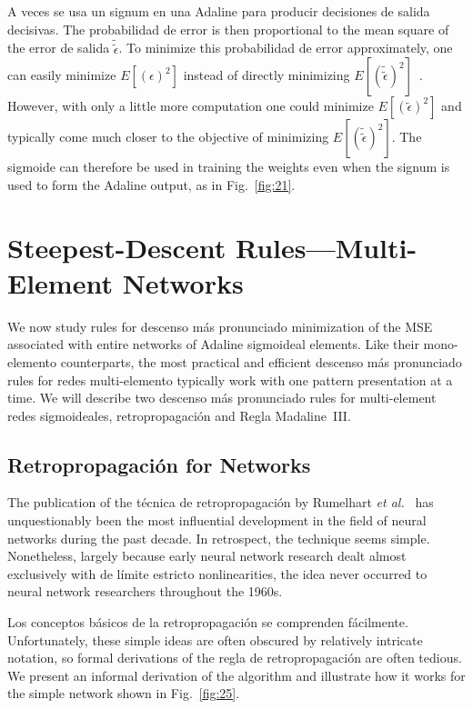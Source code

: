 \documentclass[10pt,twocolumn]{article}
\begin{document}
A veces se usa un signum en una Adaline para producir decisiones de salida decisivas. The
probabilidad de error is then proportional to the mean square of the error de salida
$\tilde{\tilde{\epsilon}}$. To minimize this probabilidad de error approximately, one
can easily minimize $E[(\epsilon)^2]$ instead of directly minimizing
$E[(\tilde{\tilde{\epsilon}})^2]$~\cite{ieeewescon}. However, with only a little
more computation one could minimize $E[(\tilde{\epsilon})^2]$ and typically come
much closer to the objective of minimizing $E[(\tilde{\tilde{\epsilon}})^2]$. The
sigmoide can therefore be used in training the weights even when the signum is used
to form the Adaline output, as in Fig.~\ref{fig:21}.

\section{Steepest-Descent Rules---Multi-Element Networks}
We now study rules for descenso más pronunciado minimization of the MSE associated with
entire networks of Adaline sigmoideal elements. Like their mono-elemento
counterparts, the most practical and efficient descenso más pronunciado rules for
redes multi-elemento typically work with one pattern presentation at a time. We
will describe two descenso más pronunciado rules for multi-element redes sigmoideales,
retropropagación and Regla Madaline~III.

\subsection{Retropropagación for Networks}
The publication of the técnica de retropropagación by Rumelhart \textit{et
al.}~\cite{rhw86} has unquestionably been the most influential development in the
field of neural networks during the past decade. In retrospect, the technique
seems simple. Nonetheless, largely because early neural network research dealt
almost exclusively with de límite estricto nonlinearities, the idea never occurred to
neural network researchers throughout the 1960s.

Los conceptos básicos de la retropropagación se comprenden fácilmente. Unfortunately, these
simple ideas are often obscured by relatively intricate notation, so formal
derivations of the regla de retropropagación are often tedious. We present an informal
derivation of the algorithm and illustrate how it works for the simple network
shown in Fig.~\ref{fig:25}.
\end{document}
